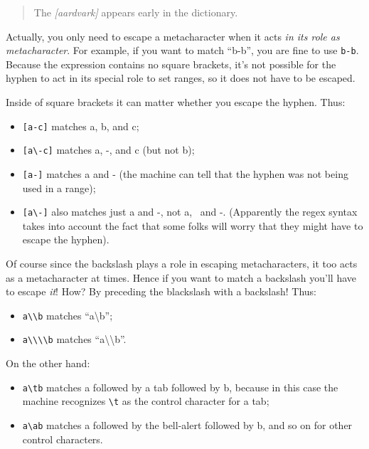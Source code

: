 \documentclass[]{book}
\providecommand{\tightlist}{%
  \setlength{\itemsep}{0pt}\setlength{\parskip}{0pt}}
\theoremstyle{definition}
\theoremstyle{definition}
\theoremstyle{remark}
\begin{document}
{\begin{quote}
The \emph{{[}aardvark{]}} appears early in the dictionary.
\end{quote}

Actually, you only need to escape a metacharacter when it acts \emph{in
its role as metacharacter}. For example, if you want to match ``b-b'',
you are fine to use \texttt{b-b}. Because the expression contains no
square brackets, it's not possible for the hyphen to act in its special
role to set ranges, so it does not have to be escaped.

Inside of square brackets it can matter whether you escape the hyphen.
Thus:

\begin{itemize}
\tightlist
\item
  \texttt{{[}a-c{]}} matches a, b, and c;
\item
  \texttt{{[}a\textbackslash{}-c{]}} matches a, -, and c (but not b);
\item
  \texttt{{[}a-{]}} matches a and - (the machine can tell that the
  hyphen was not being used in a range);
\item
  \texttt{{[}a\textbackslash{}-{]}} also matches just a and -, not a,
  ~and -. (Apparently the regex syntax takes into account the fact that
  some folks will worry that they might have to escape the hyphen).
\end{itemize}

Of course since the backslash plays a role in escaping metacharacters,
it too acts as a metacharacter at times. Hence if you want to match a
backslash you'll have to escape \emph{it}! How? By preceding the
blackslash with a backslash! Thus:

\begin{itemize}
\tightlist
\item
  \texttt{a\textbackslash{}\textbackslash{}b} matches
  ``a\textbackslash{}b'';
\item
  \texttt{a\textbackslash{}\textbackslash{}\textbackslash{}\textbackslash{}b}
  matches ``a\textbackslash{}\textbackslash{}b''.
\end{itemize}

On the other hand:

\begin{itemize}
\tightlist
\item
  \texttt{a\textbackslash{}tb} matches a followed by a tab followed by
  b, because in this case the machine recognizes
  \texttt{\textbackslash{}t} as the control character for a tab;
\item
  \texttt{a\textbackslash{}ab} matches a followed by the bell-alert
  followed by b, and so on for other control characters.
\end{itemize}

}
\end{document}

